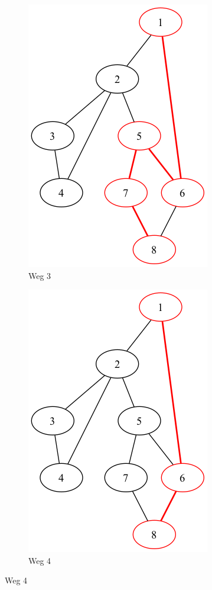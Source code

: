 \documentclass[a4paper,11pt]{report}
\begin{document}
\begin{figure}[htbp]
    \begin{subfigure}[b]{0.45\textwidth}
        \includegraphics[height=0.2\textheight]{notebook/assets/aufgabe_03_graph_path_1_to_8_3.png}
        \caption{Weg 3}
        \label{fig:way_3}
    \end{subfigure}
    \hfill
    \begin{subfigure}[b]{0.45\textwidth}
        \includegraphics[height=0.2\textheight]{notebook/assets/aufgabe_03_graph_path_1_to_8_4.png}
        \caption{Weg 4}
        \label{fig:way_4}
    \end{subfigure}
\end{figure}
\end{document}
